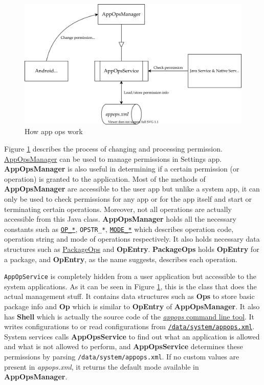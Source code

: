 \begin{figure}[ht]
    \centering
    \includegraphics{./images/appops.svg}
    \caption{How app ops work} %
    \label{fig:appops}
\end{figure}
Figure \hyperref[fig:appops]{1} describes the process of changing and processing permission.
\hyperref[sec:appopsmanager]{AppOpsManager} can be used to manage permissions in Settings app. \textbf{AppOpsManager} is
also useful in determining if a certain permission (or operation) is granted to the application. Most of the methods of
\textbf{AppOpsManager} are accessible to the user app but unlike a system app, it can only be used to check permissions
for any app or for the app itself and start or terminating certain operations. Moreover, not all operations are actually
accessible from this Java class. \textbf{AppOpsManager} holds all the necessary constants such as
\hyperref[subsec:op-constants]{\texttt{OP\_*}}, \texttt{OPSTR\_*}, \hyperref[subsec:mode-constants]{\texttt{MODE\_*}}
which describes operation code, operation string and mode of operations respectively. It also holds necessary data
structures such as \hyperref[subsec:package-ops]{PackageOps} and \textbf{OpEntry}. \textbf{PackageOps} holds
\textbf{OpEntry} for a package, and \textbf{OpEntry}, as the name suggests, describes each operation.

\texttt{AppOpService} is completely hidden from a user application but accessible to the system applications.
As it can be seen in Figure \hyperref[fig:appops]{1}, this is the class that does the actual management stuff.
It contains data structures such as \textbf{Ops} to store basic package info and \textbf{Op} which is similar to
\textbf{OpEntry} of \textbf{AppOpsManager}.
It also has \textbf{Shell} which is actually the source code of the \hyperref[sec:appops-cli]{\textit{appops} command line tool}.
It writes configurations to or read configurations from \hyperref[sec:appops-xml]{\texttt{/data/system/appops.xml}}.
System services calls \textbf{AppOpsService} to find out what an application is allowed and what is not allowed to perform,
and \textbf{AppOpsService} determines these permissions by parsing \texttt{/data/system/appops.xml}. If no custom values
are present in \textit{appops.xml}, it returns the default mode available in \textbf{AppOpsManager}.

